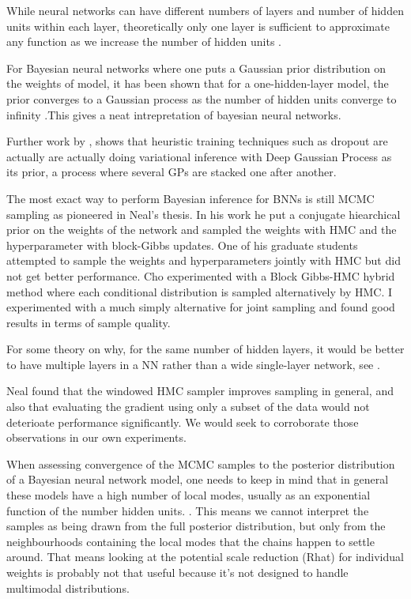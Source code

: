 \documentclass[]{report}
\begin{document}
While neural networks can have different numbers of layers and number of hidden
units within each layer, theoretically only one layer is sufficient to
approximate any function as we increase the number of hidden units \cite{hornik1991approximation}. 

For Bayesian neural networks where one puts a Gaussian prior distribution on the weights of model, it has been shown that for a one-hidden-layer model, the prior converges to a Gaussian process as the number of hidden units converge to infinity \cite{neal2012bayesian}.This gives a neat intrepretation of bayesian neural networks. 

Further work by \cite{gal2015dropout}, shows that heuristic training techniques such as dropout \cite{srivastava2014dropout}  are actually are actually doing variational inference with Deep Gaussian Process \cite{damianou2013deep} as its prior, a process where several GPs are stacked one after another. 

The most exact way to perform Bayesian inference for BNNs is still MCMC sampling as pioneered in Neal's thesis. In his work he put a conjugate hiearchical prior on the weights of the network and sampled the weights with HMC and the hyperparameter with block-Gibbs updates. One of his graduate students attempted to sample the weights and hyperparameters jointly with HMC but did not get better performance. Cho experimented with a Block Gibbs-HMC hybrid method where each conditional distribution is sampled alternatively by HMC. I experimented with a much simply alternative for joint sampling and found good results in terms of sample quality. 

For some theory on why, for the same number of hidden layers, it would be better to have multiple layers in a NN rather than a wide single-layer network, see \cite{montufar2014number}. 

Neal found that the windowed HMC sampler improves sampling in general, and also that evaluating the gradient using only a subset of the data would not deterioate performance significantly. We would seek to corroborate those observations in our own experiments.

When assessing convergence of the MCMC samples to the posterior distribution of a Bayesian neural network model, one needs to keep in mind that in general these models have a high number of local modes, usually as an exponential function of the number hidden units. \cite{bishop1995neural}. This means we cannot interpret the samples as being drawn from the full posterior distribution, but only from the neighbourhoods containing the local modes that the chains happen to settle around. That means looking at the potential scale reduction (Rhat) for individual weights is probably not that useful because it's not designed to handle multimodal distributions.  
\end{document}
